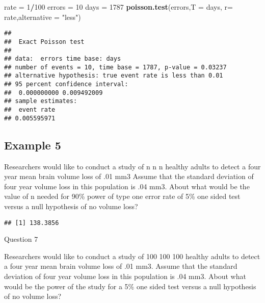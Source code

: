 \documentclass[
]{article}
\newenvironment{Shaded}{\begin{snugshade}}{\end{snugshade}}
\newcommand{\DataTypeTok}[1]{\textcolor[rgb]{0.13,0.29,0.53}{#1}}
\newcommand{\DecValTok}[1]{\textcolor[rgb]{0.00,0.00,0.81}{#1}}
\newcommand{\FloatTok}[1]{\textcolor[rgb]{0.00,0.00,0.81}{#1}}
\newcommand{\KeywordTok}[1]{\textcolor[rgb]{0.13,0.29,0.53}{\textbf{#1}}}
\newcommand{\NormalTok}[1]{#1}
\newcommand{\OperatorTok}[1]{\textcolor[rgb]{0.81,0.36,0.00}{\textbf{#1}}}
\newcommand{\StringTok}[1]{\textcolor[rgb]{0.31,0.60,0.02}{#1}}
\begin{document}
\begin{Shaded}
\begin{Highlighting}[]
\NormalTok{rate =}\StringTok{ }\DecValTok{1}\OperatorTok{/}\DecValTok{100}
\NormalTok{errors =}\StringTok{ }\DecValTok{10}
\NormalTok{days =}\StringTok{ }\DecValTok{1787}
\KeywordTok{poisson.test}\NormalTok{(errors,}\DataTypeTok{T =}\NormalTok{ days, }\DataTypeTok{r=}\NormalTok{ rate,}\DataTypeTok{alternative =} \StringTok{"less"}\NormalTok{)}
\end{Highlighting}
\end{Shaded}

\begin{verbatim}
## 
##  Exact Poisson test
## 
## data:  errors time base: days
## number of events = 10, time base = 1787, p-value = 0.03237
## alternative hypothesis: true event rate is less than 0.01
## 95 percent confidence interval:
##  0.000000000 0.009492009
## sample estimates:
##  event rate 
## 0.005595971
\end{verbatim}

\hypertarget{example-5}{%
\subsection{Example 5}\label{example-5}}

Researchers would like to conduct a study of n n n healthy adults to
detect a four year mean brain volume loss of .01 mm3 Assume that the
standard deviation of four year volume loss in this population is .04
mm3. About what would be the value of n needed for 90\% power of type
one error rate of 5\% one sided test versus a null hypothesis of no
volume loss?

\begin{Shaded}
\end{Shaded}

\begin{verbatim}
## [1] 138.3856
\end{verbatim}

Question 7

Researchers would like to conduct a study of 100 100 100 healthy adults
to detect a four year mean brain volume loss of .01 mm3. Assume that the
standard deviation of four year volume loss in this population is .04
mm3. About what would be the power of the study for a 5\% one sided test
versus a null hypothesis of no volume loss?
\end{document}
